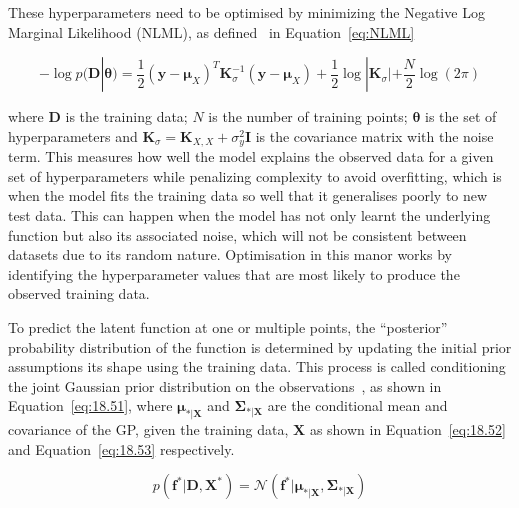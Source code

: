 \documentclass[12pt]{article}
\begin{document}
    These hyperparameters need to be optimised by minimizing the Negative Log Marginal Likelihood (NLML), as defined~\cite{murphy2023probabilistic} in Equation~\ref{eq:NLML}

    \begin{equation}
        -\log p(\mathbf{D}|\boldsymbol{\theta}) = \frac{1}{2} (\mathbf{y} - \boldsymbol{\mu}_X)^T \mathbf{K}_{\sigma}^{-1} (\mathbf{y} - \boldsymbol{\mu}_X) + \frac{1}{2} \log |\mathbf{K}_{\sigma}| + \frac{N}{2} \log(2\pi)\label{eq:NLML}
    \end{equation}


    \noindent where $\mathbf{D}$ is the training data; $N$ is the number of training points; $\boldsymbol{\theta}$ is the set of hyperparameters and $\mathbf{K}_{\sigma} = \mathbf{K}_{X,X} + \sigma^2_y \mathbf{I}$ is the covariance matrix with the noise term.
    This measures how well the model explains the observed data for a given set of hyperparameters while penalizing complexity to avoid overfitting, which is when the model fits the training data so well that it generalises poorly to new test data.
    This can happen when the model has not only learnt the underlying function but also its associated noise, which will not be consistent between datasets due to its random nature.
    Optimisation in this manor works by identifying the hyperparameter values that are most likely to produce the observed training data.

    To predict the latent function at one or multiple points, the ``posterior'' probability distribution of the function is determined by updating the initial prior assumptions its shape using the training data.
    This process is called conditioning the joint Gaussian prior distribution on the observations~\cite{rasmussen2006gaussian}, as shown in Equation~\ref{eq:18.51}, where $\boldsymbol{\mu}_{*\vert \mathbf{X}}$ and $\boldsymbol{\Sigma}_{*\vert \mathbf{X}}$ are the conditional mean and covariance of the GP, given the training data, $\mathbf{X}$ as shown in Equation~\ref{eq:18.52} and Equation~\ref{eq:18.53} respectively.

    \begin{equation}
        p(\mathbf{f}^* \vert \mathbf{D}, \mathbf{X}^*) = \mathcal{N}(\mathbf{f}^* \vert \boldsymbol{\mu}_{*\vert \mathbf{X}}, \boldsymbol{\Sigma}_{*\vert \mathbf{X}})\label{eq:18.51}
    \end{equation}
\end{document}
